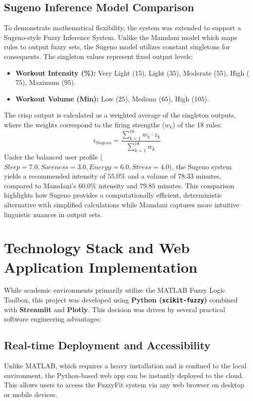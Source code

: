 \documentclass[conference]{IEEEtran}
\begin{document}
\subsection{Sugeno Inference Model Comparison}
To demonstrate mathematical flexibility, the system was extended to support a Sugeno-style Fuzzy Inference System. Unlike the Mamdani model which maps rules to output fuzzy sets, the Sugeno model utilizes constant singletons for consequents. The singleton values represent fixed output levels:
\begin{itemize}
    \item \textbf{Workout Intensity (\%):} Very Light ($15$), Light ($35$), Moderate ($55$), High ($75$), Maximum ($95$).
    \item \textbf{Workout Volume (Min):} Low ($25$), Medium ($65$), High ($105$).
\end{itemize}
The crisp output is calculated as a weighted average of the singleton outputs, where the weights correspond to the firing strengths ($w_k$) of the 18 rules:
\begin{equation}
z_{Sugeno} = \frac{\sum_{k=1}^{18} w_k \cdot z_k}{\sum_{k=1}^{18} w_k}
\end{equation}
Under the balanced user profile ($Sleep=7.0, Soreness=3.0, Energy=6.0, Stress=4.0$), the Sugeno system yields a recommended intensity of $55.0\%$ and a volume of $78.33$ minutes, compared to Mamdani's $60.0\%$ intensity and $79.85$ minutes. This comparison highlights how Sugeno provides a computationally efficient, deterministic alternative with simplified calculations while Mamdani captures more intuitive linguistic nuances in output sets.


\section{Technology Stack and Web Application Implementation}
While academic environments primarily utilize the MATLAB Fuzzy Logic Toolbox, this project was developed using \textbf{Python (\texttt{scikit-fuzzy})} combined with \textbf{Streamlit} and \textbf{Plotly}. This decision was driven by several practical software engineering advantages:

\subsection{Real-time Deployment and Accessibility}
Unlike MATLAB, which requires a heavy installation and is confined to the local environment, the Python-based web app can be instantly deployed to the cloud. This allows users to access the FuzzyFit system via any web browser on desktop or mobile devices.
\end{document}
